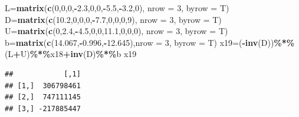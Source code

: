 \documentclass[
]{article}
\newenvironment{Shaded}{\begin{snugshade}}{\end{snugshade}}
\newcommand{\AttributeTok}[1]{\textcolor[rgb]{0.13,0.29,0.53}{#1}}
\newcommand{\DecValTok}[1]{\textcolor[rgb]{0.00,0.00,0.81}{#1}}
\newcommand{\FloatTok}[1]{\textcolor[rgb]{0.00,0.00,0.81}{#1}}
\newcommand{\FunctionTok}[1]{\textcolor[rgb]{0.13,0.29,0.53}{\textbf{#1}}}
\newcommand{\NormalTok}[1]{#1}
\newcommand{\OtherTok}[1]{\textcolor[rgb]{0.56,0.35,0.01}{#1}}
\newcommand{\SpecialCharTok}[1]{\textcolor[rgb]{0.81,0.36,0.00}{\textbf{#1}}}
\begin{document}
\begin{Shaded}
\begin{Highlighting}[]
\NormalTok{  L}\OtherTok{=}\FunctionTok{matrix}\NormalTok{(}\FunctionTok{c}\NormalTok{(}\DecValTok{0}\NormalTok{,}\DecValTok{0}\NormalTok{,}\DecValTok{0}\NormalTok{,}\SpecialCharTok{{-}}\FloatTok{2.3}\NormalTok{,}\DecValTok{0}\NormalTok{,}\DecValTok{0}\NormalTok{,}\SpecialCharTok{{-}}\FloatTok{5.5}\NormalTok{,}\SpecialCharTok{{-}}\FloatTok{3.2}\NormalTok{,}\DecValTok{0}\NormalTok{), }\AttributeTok{nrow =} \DecValTok{3}\NormalTok{, }\AttributeTok{byrow =}\NormalTok{ T)}
\NormalTok{  D}\OtherTok{=}\FunctionTok{matrix}\NormalTok{(}\FunctionTok{c}\NormalTok{(}\FloatTok{10.2}\NormalTok{,}\DecValTok{0}\NormalTok{,}\DecValTok{0}\NormalTok{,}\DecValTok{0}\NormalTok{,}\SpecialCharTok{{-}}\FloatTok{7.7}\NormalTok{,}\DecValTok{0}\NormalTok{,}\DecValTok{0}\NormalTok{,}\DecValTok{0}\NormalTok{,}\DecValTok{9}\NormalTok{), }\AttributeTok{nrow =} \DecValTok{3}\NormalTok{, }\AttributeTok{byrow =}\NormalTok{ T)}
\NormalTok{  U}\OtherTok{=}\FunctionTok{matrix}\NormalTok{(}\FunctionTok{c}\NormalTok{(}\DecValTok{0}\NormalTok{,}\FloatTok{2.4}\NormalTok{,}\SpecialCharTok{{-}}\FloatTok{4.5}\NormalTok{,}\DecValTok{0}\NormalTok{,}\DecValTok{0}\NormalTok{,}\FloatTok{11.1}\NormalTok{,}\DecValTok{0}\NormalTok{,}\DecValTok{0}\NormalTok{,}\DecValTok{0}\NormalTok{), }\AttributeTok{nrow =} \DecValTok{3}\NormalTok{, }\AttributeTok{byrow =}\NormalTok{ T)}
\NormalTok{  b}\OtherTok{=}\FunctionTok{matrix}\NormalTok{(}\FunctionTok{c}\NormalTok{(}\FloatTok{14.067}\NormalTok{,}\SpecialCharTok{{-}}\FloatTok{0.996}\NormalTok{,}\SpecialCharTok{{-}}\FloatTok{12.645}\NormalTok{),}\AttributeTok{nrow =} \DecValTok{3}\NormalTok{, }\AttributeTok{byrow =}\NormalTok{ T)}
\NormalTok{  x19}\OtherTok{=}\NormalTok{(}\SpecialCharTok{{-}}\FunctionTok{inv}\NormalTok{(D))}\SpecialCharTok{\%*\%}\NormalTok{(L}\SpecialCharTok{+}\NormalTok{U)}\SpecialCharTok{\%*\%}\NormalTok{x18}\SpecialCharTok{+}\FunctionTok{inv}\NormalTok{(D)}\SpecialCharTok{\%*\%}\NormalTok{b}
\NormalTok{  x19}
\end{Highlighting}
\end{Shaded}

\begin{verbatim}
##            [,1]
## [1,]  306798461
## [2,]  747111145
## [3,] -217885447
\end{verbatim}
\end{document}
